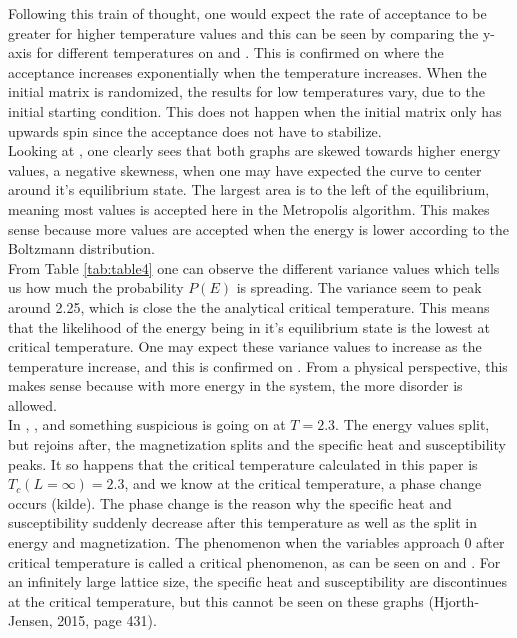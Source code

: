 \documentclass[10pt,a4paper]{article}
\begin{document}
\noindent Following this train of thought, one would expect the rate of acceptance to be greater for higher temperature values and this can be seen by comparing the y-axis for different temperatures on  and . This is confirmed on  where the acceptance increases exponentially when the temperature increases. When the initial matrix is randomized, the results for low temperatures vary, due to the initial starting condition. This does not happen when the initial matrix only has upwards spin since the acceptance does not have to stabilize.\\

\noindent Looking at , one clearly sees that both graphs are skewed towards higher energy values, a negative skewness, when one may have expected the curve to center around it's equilibrium state. The largest area is to the left of the equilibrium, meaning most values is accepted here in the Metropolis algorithm. This makes sense because more values are accepted when the energy is lower according to the Boltzmann distribution.\\

\noindent From Table \ref{tab:table4} one can observe the different variance values which tells us how much the probability $P(E)$ is spreading. The variance seem to peak around 2.25, which is close the the analytical critical temperature. This means that the likelihood of the energy being in it's equilibrium state is the lowest at critical temperature. One may expect these variance values to increase as the temperature increase, and this is confirmed on . From a physical perspective, this makes sense because with more energy in the system, the more disorder is allowed.\\

\noindent In , ,  and  something suspicious is going on at $T = 2.3$. The energy values split, but rejoins after, the magnetization splits and the specific heat and susceptibility peaks. It so happens that the critical temperature calculated in this paper is $T_c(L = \infty) = 2.3$, and we know at the critical temperature, a phase change occurs (kilde). The phase change is the reason why the specific heat and susceptibility suddenly decrease after this temperature as well as the split in energy and magnetization. The phenomenon when the variables approach $0$ after critical temperature is called a critical phenomenon, as can be seen on  and . For an infinitely large lattice size, the specific heat and susceptibility are discontinues at the critical temperature, but this cannot be seen on these graphs (Hjorth-Jensen, 2015, page 431).\\
\end{document}
